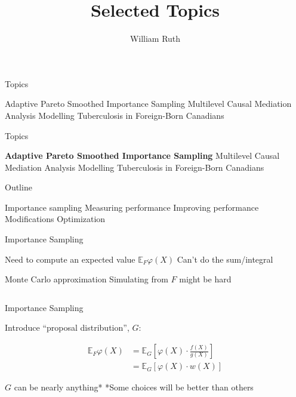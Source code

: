 \documentclass[14pt]{beamer}
\title[]{Selected Topics}
\author{William Ruth}
\institute[]{Université de Montréal}
\date{\vspace{-3cm}}
\newcommand{\bE}{\mathbb{E}}
\begin{document}
\begin{frame}
    \titlepage
\end{frame}

\begin{frame}{Topics}
    \begin{outline}
        \1 Adaptive Pareto Smoothed Importance Sampling \newline
        \1 Multilevel Causal Mediation Analysis \newline
        \1 Modelling Tuberculosis in Foreign-Born Canadians
    \end{outline}
\end{frame}

\begin{frame}{Topics}
    \begin{outline}
        \1 \textbf{Adaptive Pareto Smoothed Importance Sampling} \newline
        \1 Multilevel Causal Mediation Analysis \newline
        \1 Modelling Tuberculosis in Foreign-Born Canadians
    \end{outline}
\end{frame}

\begin{frame}{Outline}
    \begin{outline}
        \1 Importance sampling \newline
        \1 Measuring performance \newline
        \1 Improving performance
            \2 Modifications
            \2 Optimization
    \end{outline}
\end{frame}


\begin{frame}{Importance Sampling}
    \begin{outline}
        \1 Need to compute an expected value
            \2 $\bE_F \varphi(X)$
        \1 Can't do the sum/integral \newline

        \1 Monte Carlo approximation
            \2 Simulating from $F$ might be hard
    \end{outline}
    \begin{equation*}
    \end{equation*}
\end{frame}

\begin{frame}{Importance Sampling}
    \begin{outline}
        \1 Introduce ``proposal distribution'', $G$:
    \end{outline}
    \begin{align*}
        \bE_F \varphi(X) &=  \bE_G \left[ \varphi(X) \cdot \frac{f(X)}{g(X)} \right] \\
        &=  \bE_G \left[ \varphi(X) \cdot w(X) \right]
    \end{align*}
    \begin{outline}
        \1 $G$ can be nearly anything*
            \2 *Some choices will be better than others
    \end{outline}
\end{frame}
\end{document}
